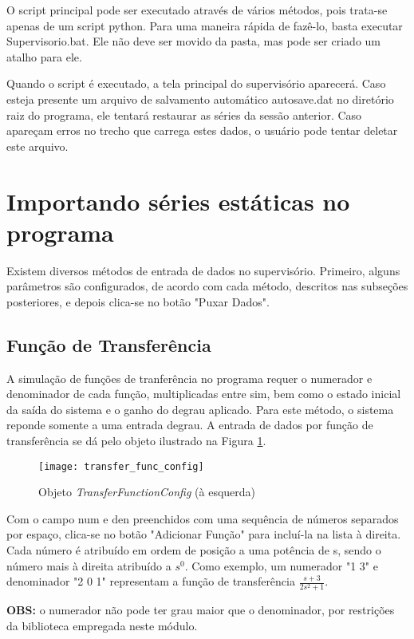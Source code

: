 O script principal pode ser executado através de vários métodos, pois trata-se apenas de um script python. Para uma maneira rápida de fazê-lo, basta executar Supervisorio.bat. Ele não deve ser movido da pasta, mas pode ser criado um atalho para ele.

Quando o script é executado, a tela principal do supervisório aparecerá. Caso esteja presente um arquivo de salvamento automático autosave.dat no diretório raiz do programa, ele tentará restaurar as séries da sessão anterior. Caso apareçam erros no trecho que carrega estes dados, o usuário pode tentar deletar este arquivo.

\section{Importando séries estáticas no programa}

Existem diversos métodos de entrada de dados no supervisório. Primeiro, alguns parâmetros são configurados, de acordo com cada método, descritos nas subseções posteriores, e depois clica-se no botão "Puxar Dados".

\subsection{Função de Transferência}

A simulação de funções de tranferência no programa requer o numerador e denominador de cada função, multiplicadas entre sim, bem como o estado inicial da saída do sistema e o ganho do degrau aplicado. Para este método, o sistema reponde somente a uma entrada degrau. A entrada de dados por função de transferência se dá pelo objeto ilustrado na Figura \ref{img_transfer_func_config}.

\begin{figure}[!htb]
	\centering
	\texttt{[image: transfer\_func\_config]}
	\caption{Objeto \emph{TransferFunctionConfig} (à esquerda)}
	\label{img_transfer_func_config}
\end{figure}

Com o campo num e den preenchidos com uma sequência de números separados por espaço, clica-se no botão "Adicionar Função" para incluí-la na lista à direita. Cada número é atribuído em ordem de posição a uma potência de s, sendo o número mais à direita atribuído a $s^0$. Como exemplo, um numerador "1 3" e denominador "2 0 1" representam a função de transferência $\frac{s + 3}{2s^2 + 1}$.

\textbf{OBS:} o numerador não pode ter grau maior que o denominador, por restrições da biblioteca empregada neste módulo.


